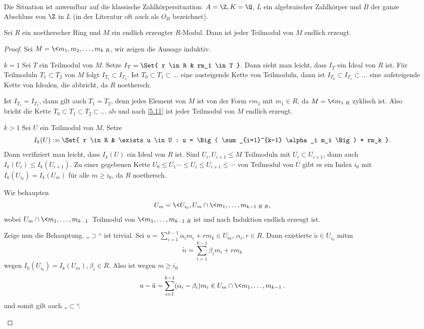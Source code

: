 Die Situation ist anwendbar auf die klassische Zahlkörpersituation: $A = \Z, K = \Q$, $L$ ein algebraischer Zahlkörper und $B$ der ganze Abschluss von $\Z$ in $L$ (in der Literatur oft auch als $O_B$ bezeichnet).

\begin{st} \label{5.10}
	Sei $R$ ein noetherscher Ring und $M$ ein endlich erzeugter $R$-Modul.
	Dann ist jeder Teilmodul von $M$ endlich erzeugt.
	\begin{proof}
		Sei $M = \<m_1, m_2, \dotsc, m_k\>_R$, wir zeigen die Aussage induktiv.
		\begin{seg}{$k = 1$}
			Sei $T$ ein Teilmodul von $M$.
			Setze $I_T = \Set{ r \in R & rm_1 \in T }$.
			Dann sieht man leicht, dass $I_T$ ein Ideal von $R$ ist.
			Für Teilmoduln $T_1 \subset T_2$ von $M$ folgt $I_{T_1} \subset I_{T_2}$.
			Ist $T_0 \subset T_1 \subset \dotsc$ eine austeigende Kette von Teilmoduln, dann ist $I_{T_0} \subset I_{T_1} \subset \dotsc$ eine aufsteigende Kette von Idealen, die abbricht, da $R$ noethersch.

			Ist $I_{T_1} = I_{T_2}$, dann gilt auch $T_1 = T_2$, denn jedes Element von $M$ ist von der Form $r m_1$ mit $m_1 \in R$, da $M = \< m_1 \>_R$ zyklisch ist.
			Also bricht die Kette $T_0 \subset T_1 \subset T_2 \subset \dotsc$ ab und nach \ref{5.11} ist jeder Teilmodul von $M$ endlich erzeugt.
		\end{seg}
		\begin{seg}{$k > 1$}
			Sei $U$ ein Teilmodul von $M$.
			Setze
			\[
				I_k(U) := \Set{ r \in R & \exists u \in U : u = \Big( \sum_{i=1}^{k-1} \alpha_i m_i \Big) + rm_k }.
			\]
			Dann verifiziert man leicht, dass $I_k(U)$ ein Ideal von $R$ ist.
			Sind $U_i, U_{i+1} \le M$ Teilmoduln mit $U_i \subset U_{i+1}$, dann auch $I_k(U_i) \le I_k(U_{i+1})$.
			Zu einer gegebenen Kette $U_0 \le U_1 \dotsb \le U_{i} \le U_{i+1} \le \dotsb$ von Teilmodul von $U$ gibt es ein Index $i_0$ mit $I_k(U_{i_0}) = I_k(U_m)$ für alle $m \ge i_0$, da $R$ noethersch.

			Wir behaupten
			\[
				U_m = \< U_{i_0}, U_m \cap \<m_1, \dotsc, m_{k-1}\>_R \>_R,
			\]
			wobei $U_m \cap \<m_1, \dotsc, m_{k-1}\>$ Teilmodul von $\<m_1, \dotsc, m_{k-1}\>_R$ ist und nach Induktion endlich erzeugt ist.

			Zeige nun die Behauptung.
			„$\supset$“ ist trivial.
			Sei $u = \sum_{i=1}^{k-1} \alpha_i m_i + r m_k \in U_m$, $\alpha_i, r \in R$.
			Dann existierte $\tilde u \in U_{i_0}$ mitm
			\[
				\tilde n = \sum_{i=1}^{k-1} \beta_i m_i + r m_k
			\]
			wegen $I_k(U_{i_0}) = I_k(U_m), \beta_i \in R$.
			Also ist wegen $m \ge i_0$
			\[
				u - \tilde u = \sum_{i=1}^{k-1} (\alpha_i - \beta_i) m_i  \in U_m \cap \< m_1, \dotsc, m_{k-1} \>.
			\]
			und somit gilt auch „$\subset$“.


\end{seg}
\end{proof}
\end{st}
